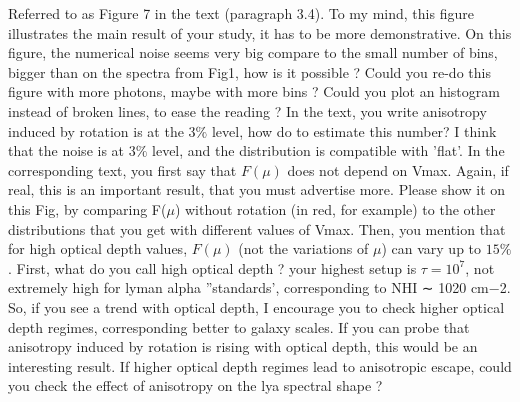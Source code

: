 \documentclass[12pt]{article}
\begin{document}
Referred to as Figure 7 in the text (paragraph 3.4). To my mind, this figure illustrates the main result of your study, it has to be more demonstrative. On this figure, the numerical noise seems very big compare to the small number of bins, bigger than on the spectra from Fig1, how is it possible ? Could you re-do this figure with more photons, maybe with more bins ? Could you plot an histogram instead of broken lines, to ease the reading ? In the text, you write anisotropy induced by rotation is at the 3$\%$ level, how do to estimate this number? I think that the noise is at $3\%$ level, and the distribution is compatible with ’flat’. In the corresponding text, you first say that $F(\mu)$ does not depend on Vmax. Again, if real, this is an important result, that you must advertise more. Please show it on this Fig, by comparing F($\mu$) without rotation (in red, for example) to the other distributions that you get with different values of Vmax. Then, you mention that for high optical depth values, $F(\mu)$ (not the variations of $\mu$) can vary up to $15\%$. First, what do you call high optical depth ? your highest setup is $\tau = 10^{7}$, not extremely high for lyman alpha ”standards’, corresponding to NHI ∼ 1020 cm−2. So, if you see a trend with optical depth, I encourage you to check higher optical depth regimes, corresponding better to galaxy scales. If you can probe that anisotropy induced by rotation is rising with optical depth, this would be an interesting result.
If higher optical depth regimes lead to anisotropic escape, could you check the effect of anisotropy on the lya spectral shape ?
\end{document}

